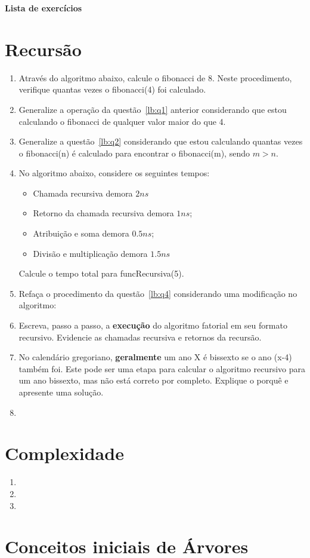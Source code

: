 \documentclass[12pt]{article}
\begin{document}
\begin{center}
    \LARGE \textbf{Lista de exercícios}
\end{center}
\section*{Recursão}
\begin{enumerate}[label=\textbf{Q\arabic*.}]
    \item Através do algoritmo abaixo, calcule o fibonacci de 8. Neste procedimento, verifique quantas vezes o fibonacci(4) foi calculado.
    \label{lb:q1}
    
    \item Generalize a operação da questão~\ref{lb:q1} anterior considerando que estou calculando o fibonacci de qualquer valor maior do que 4.\label{lb:q2}
    
    \item Generalize a questão~\ref{lb:q2} considerando que estou calculando quantas vezes o fibonacci(n) é calculado para encontrar o fibonacci(m), sendo $m>n$.
    
    \item No algoritmo abaixo, considere os seguintes tempos:
    \begin{itemize}
        \item Chamada recursiva demora $2ns$
        \item Retorno da chamada recursiva demora $1ns$;
        \item Atribuição e soma demora $0.5ns$;
        \item Divisão e multiplicação demora $1.5ns$
    \end{itemize}
    
    Calcule o tempo total para funcRecursiva(5).\label{lb:q4}

    \item Refaça o procedimento da questão~\ref{lb:q4} considerando uma modificação no algoritmo:

    \item Escreva, passo a passo, a \textbf{execução} do algoritmo fatorial em seu formato recursivo. Evidencie as chamadas recursiva e retornos da recursão.
    
    \item No calendário gregoriano, \textbf{geralmente} um ano X é bissexto se o ano (x-4) também foi. Este pode ser uma etapa para calcular o algoritmo recursivo para um ano bissexto, mas não está correto por completo. Explique o porquê e apresente uma solução.
    
    \item 

\end{enumerate}
\section*{Complexidade}
\begin{enumerate}[resume,label=\textbf{Q\arabic*.}]
    \item 
    \item 
    \item 
\end{enumerate}
\section*{Conceitos iniciais de Árvores}
\end{document}
